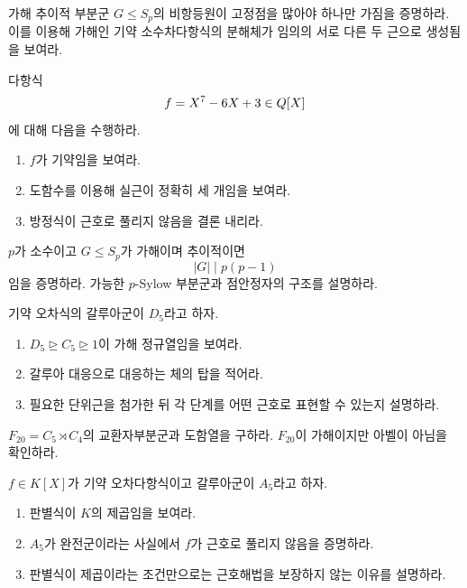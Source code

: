 \begin{exercise}
가해 추이적 부분군 $G\le S_p$의 비항등원이 고정점을 많아야 하나만 가짐을 증명하라. 이를 이용해 가해인 기약 소수차다항식의 분해체가 임의의 서로 다른 두 근으로 생성됨을 보여라.
\end{exercise}

\begin{exercise}[*]
다항식
\[
  f=X^7-6X+3\in Q[X]
\]
에 대해 다음을 수행하라.
\begin{enumerate}[label=(\alph*)]
  \item $f$가 기약임을 보여라.
  \item 도함수를 이용해 실근이 정확히 세 개임을 보여라.
  \item 방정식이 근호로 풀리지 않음을 결론 내리라.
\end{enumerate}
\end{exercise}

\begin{exercise}
$p$가 소수이고 $G\le S_p$가 가해이며 추이적이면
\[
  |G|\mid p(p-1)
\]
임을 증명하라. 가능한 $p$-Sylow 부분군과 점안정자의 구조를 설명하라.
\end{exercise}

\begin{exercise}[*]
기약 오차식의 갈루아군이 $D_5$라고 하자.
\begin{enumerate}[label=(\alph*)]
  \item $D_5\trianglerighteq C_5\trianglerighteq1$이 가해 정규열임을 보여라.
  \item 갈루아 대응으로 대응하는 체의 탑을 적어라.
  \item 필요한 단위근을 첨가한 뒤 각 단계를 어떤 근호로 표현할 수 있는지 설명하라.
\end{enumerate}
\end{exercise}

\begin{exercise}
$F_{20}=C_5\rtimes C_4$의 교환자부분군과 도함열을 구하라. $F_{20}$이 가해이지만 아벨이 아님을 확인하라.
\end{exercise}

\begin{exercise}[*]
$f\in K[X]$가 기약 오차다항식이고 갈루아군이 $A_5$라고 하자.
\begin{enumerate}[label=(\alph*)]
  \item 판별식이 $K$의 제곱임을 보여라.
  \item $A_5$가 완전군이라는 사실에서 $f$가 근호로 풀리지 않음을 증명하라.
  \item 판별식이 제곱이라는 조건만으로는 근호해법을 보장하지 않는 이유를 설명하라.
\end{enumerate}
\end{exercise}

